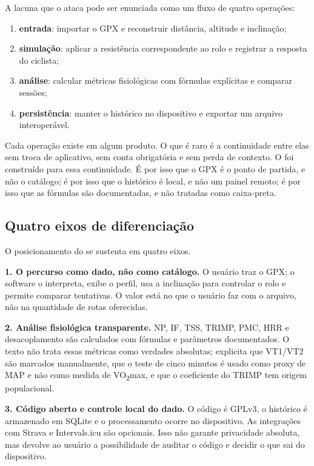 A lacuna que o \argus{} ataca pode ser enunciada como um fluxo de quatro
operações:

\begin{enumerate}
    \item \textbf{entrada}: importar o GPX e reconstruir distância, altitude e
        inclinação;
    \item \textbf{simulação}: aplicar a resistência correspondente ao rolo e
        registrar a resposta do ciclista;
    \item \textbf{análise}: calcular métricas fisiológicas com fórmulas
        explícitas e comparar sessões;
    \item \textbf{persistência}: manter o histórico no dispositivo e exportar um
        arquivo interoperável.
\end{enumerate}

Cada operação existe em algum produto. O que é raro é a continuidade entre elas
sem troca de aplicativo, sem conta obrigatória e sem perda de contexto. O
\argus{} foi construído para essa continuidade. É por isso que o GPX é o ponto
de partida, e não o catálogo; é por isso que o histórico é local, e não um
painel remoto; é por isso que as fórmulas são documentadas, e não tratadas como
caixa-preta.

\subsection{Quatro eixos de diferenciação}
\label{sec:eixos-diferenciacao}

O posicionamento do \argus{} se sustenta em quatro eixos.

\textbf{1. O percurso como dado, não como catálogo.} O usuário traz o GPX; o
software o interpreta, exibe o perfil, usa a inclinação para controlar o rolo
e permite comparar tentativas. O valor está no que o usuário faz com o arquivo,
não na quantidade de rotas oferecidas.

\textbf{2. Análise fisiológica transparente.} NP, IF, TSS, TRIMP, PMC, HRR e
desacoplamento são calculados com fórmulas e parâmetros documentados. O texto
não trata essas métricas como verdades absolutas; explicita que VT1/VT2 são
marcados manualmente, que o teste de cinco minutos é usado como proxy de MAP e
não como medida de VO\textsubscript{2}max, e que o coeficiente do TRIMP tem
origem populacional.

\textbf{3. Código aberto e controle local do dado.} O código é GPLv3, o
histórico é armazenado em SQLite e o processamento ocorre no dispositivo. As
integrações com Strava e Intervals.icu são opcionais. Isso não garante
privacidade absoluta, mas devolve ao usuário a possibilidade de auditar o
código e decidir o que sai do dispositivo.

